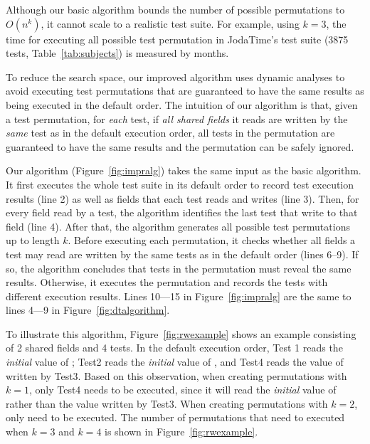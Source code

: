 Although our basic algorithm bounds the
number of possible permutations to $O(n^k)$,
it cannot scale to a realistic test suite.
For example, using $k=3$, the time for
executing all possible test permutation
in JodaTime's test suite (3875 tests, Table~\ref{tab:subjects})
is measured by months.

To reduce the search space, our improved algorithm
uses dynamic analyses to avoid executing test
permutations that are guaranteed to have the
same results as being executed in the default order.
The intuition of our algorithm is that,
given a test permutation, for \textit{each}
test, if \textit{all shared fields} it reads
are written by the \textit{same} test as
in the default execution order, all tests in
the permutation are guaranteed to
have the same results and the permutation can be safely ignored. 

Our algorithm (Figure~\ref{fig:impralg}) takes the same
input as the basic algorithm. It first executes the whole
test suite in its default order
to record test execution results (line 2) as
well as fields that each test reads and writes (line 3).
Then, for every field read by a test,
the algorithm identifies the last test that write
to that field (line 4).
After that, the algorithm generates all possible test permutations
up to length $k$. Before executing each permutation, 
it checks whether all fields a test may read are written
by the same tests as in the default order (lines 6--9).
If so, the algorithm concludes that tests in the permutation
must reveal the same results. Otherwise,
it executes the permutation and records the tests with
different execution results. Lines 10---15 in Figure~\ref{fig:impralg}
are the same to lines 4---9 in Figure~\ref{fig:dtalgorithm}.

To illustrate this algorithm, Figure~\ref{fig:rwexample} shows an example
consisting of 2 shared fields and 4 tests. In the default execution
order, Test 1 reads the \textit{initial} value of ;
Test2 reads the \textit{initial} value of , and Test4
reads the value of  written by Test3.
Based on this observation, when creating permutations with $k=1$,
only Test4 needs to be executed, since it will read the
\textit{initial} value of  rather than the 
value written by Test3. When creating permutations with $k=2$,
only  need to be executed.
The number of permutations that need to executed when
$k=3$ and $k=4$ is shown in Figure~\ref{fig:rwexample}.

